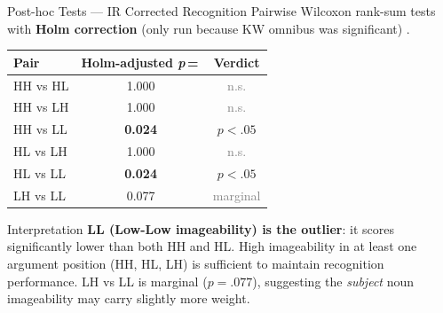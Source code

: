 \documentclass[aspectratio=169, 10pt]{beamer}
\newcommand{\pval}[1]{\textit{p}\,=\,#1}
\newcommand{\sig}[1]{\textcolor{red!70!black}{\textbf{#1}}}
\newcommand{\ns}[1]{\textcolor{gray}{#1}}
\begin{document}
\begin{frame}{Post-hoc Tests — IR Corrected Recognition}
  Pairwise Wilcoxon rank-sum tests with \textbf{Holm correction}
  (only run because KW omnibus was significant) .
  \vspace{0.6em}
  \begin{center}
  \renewcommand{\arraystretch}{1.3}
  \begin{tabular}{lcc}
    \toprule
    \textbf{Pair} & \textbf{Holm-adjusted \pval{}} & \textbf{Verdict} \\
    \midrule
    HH vs HL & 1.000 & \ns{n.s.} \\
    HH vs LH & 1.000 & \ns{n.s.} \\
    HH vs LL & \sig{0.024} & \sig{$p < .05$} \\
    HL vs LH & 1.000 & \ns{n.s.} \\
    HL vs LL & \sig{0.024} & \sig{$p < .05$} \\
    LH vs LL & 0.077 & \ns{marginal} \\
    \bottomrule
  \end{tabular}
  \end{center}
  \vspace{0.4em}
  \begin{alertblock}{Interpretation}
    \textbf{LL (Low-Low imageability) is the outlier}: it scores significantly lower than both HH and HL.
    High imageability in at least one argument position (HH, HL, LH) is sufficient to maintain recognition performance.
    LH vs LL is marginal ($p = .077$), suggesting the \emph{subject} noun imageability may carry slightly more weight.
  \end{alertblock}
\end{frame}
\end{document}
